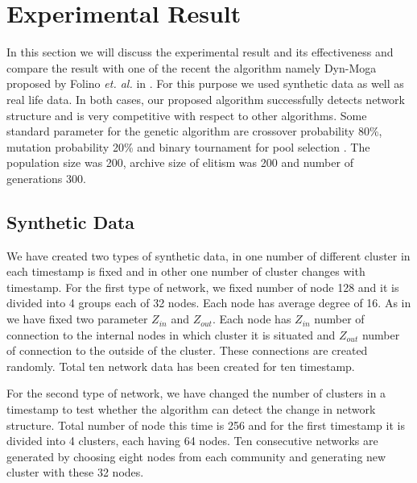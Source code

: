 \documentclass[12pt]{arsubmit}
\begin{document}
\section {Experimental Result}
In this section we will discuss the experimental result and its effectiveness and compare the result with one of the recent the algorithm namely Dyn-Moga proposed by Folino \emph{et. al.} in \cite{dynmoga}. For this purpose we used synthetic data as well as real life data. In both cases, our proposed algorithm successfully detects network structure and is very competitive with respect to other algorithms.
Some standard parameter for the genetic algorithm are crossover probability 80\%, mutation probability 20\% and binary tournament for pool selection \cite{goldberg}. The population size was 200, archive size of elitism was 200 and number of generations 300.
\subsection {Synthetic Data}

We have created two types of synthetic data, in one number of different cluster in each timestamp is fixed and in other one number of cluster changes with timestamp. 
For the first type of network, we fixed number of node 128 and it is divided into 4 groups each of 32 nodes. Each node has average degree of 16. As in \cite{dynmoga} we have fixed two parameter $Z_{in}$ and $Z_{out}$.  Each node has $Z_{in}$ number of connection to the internal nodes in which cluster it is situated and $Z_{out}$ number of connection to the outside of the cluster. These connections are created randomly. Total ten network data has been created for ten timestamp. 

For the second type of network, we have changed the number of clusters in a timestamp to test whether the algorithm can detect the change in network structure. Total number of node this time is 256 and for the first timestamp it is divided into 4 clusters, each having 64 nodes. Ten consecutive networks are generated by choosing eight nodes from each community and generating new cluster with these 32 nodes. 
\end{document}
